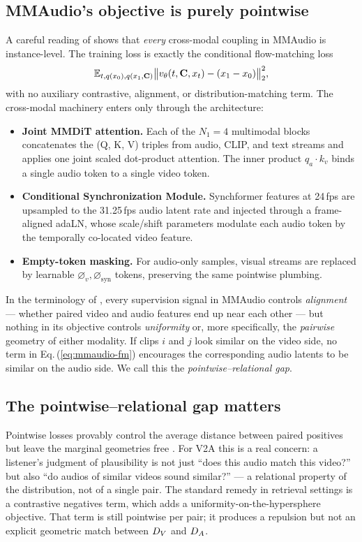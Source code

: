 \subsection{MMAudio's objective is purely pointwise}
\label{sec:intro:pointwise}
A careful reading of \citet{cheng2024mmaudio} shows that
\emph{every} cross-modal coupling in MMAudio is
instance-level. The training loss is exactly the conditional
flow-matching loss
\begin{equation}
\label{eq:mmaudio-fm}
  \mathbb{E}_{t, q(x_0), q(x_1, \mathbf{C})}
    \bigl\lVert v_\theta(t, \mathbf{C}, x_t)
      - (x_1 - x_0) \bigr\rVert_2^2,
\end{equation}
with no auxiliary contrastive, alignment, or distribution-matching
term. The cross-modal machinery enters only through the
architecture:
\begin{itemize}[leftmargin=*,topsep=2pt]
  \item \textbf{Joint MMDiT attention.} Each of the $N_1{=}4$
    multimodal blocks concatenates the (Q, K, V) triples from
    audio, CLIP, and text streams and applies one joint scaled
    dot-product attention. The inner product $q_a \cdot k_v$
    binds a single audio token to a single video token.
  \item \textbf{Conditional Synchronization Module.}
    Synchformer features at 24\,fps are upsampled to the
    31.25\,fps audio latent rate and injected through a
    frame-aligned adaLN, whose scale/shift parameters modulate
    each audio token by the temporally co-located video
    feature.
  \item \textbf{Empty-token masking.} For audio-only samples,
    visual streams are replaced by learnable
    $\varnothing_v, \varnothing_{\mathrm{syn}}$ tokens, preserving
    the same pointwise plumbing.
\end{itemize}
In the terminology of \citet{wang2020understanding}, every
supervision signal in MMAudio controls \emph{alignment}
--- whether paired video and audio features end up near each
other --- but nothing in its objective controls
\emph{uniformity} or, more specifically, the
\emph{pairwise} geometry of either modality. If clips $i$ and
$j$ look similar on the video side, no term in
Eq.\,(\ref{eq:mmaudio-fm}) encourages the corresponding audio
latents to be similar on the audio side. We call this the
\emph{pointwise--relational gap}.

\subsection{The pointwise--relational gap matters}
Pointwise losses provably control the average distance between
paired positives but leave the marginal geometries free
\citep{wang2020understanding}. For V2A this is a real concern:
a listener's judgment of plausibility is not just ``does this
audio match this video?'' but also ``do audios of similar
videos sound similar?'' --- a relational property of the
distribution, not of a single pair. The standard remedy in
retrieval settings is a contrastive negatives term, which adds
a uniformity-on-the-hypersphere objective. That term is still
pointwise per pair; it produces a repulsion but not an explicit
geometric match between $D_{V}$ and $D_{A}$.


